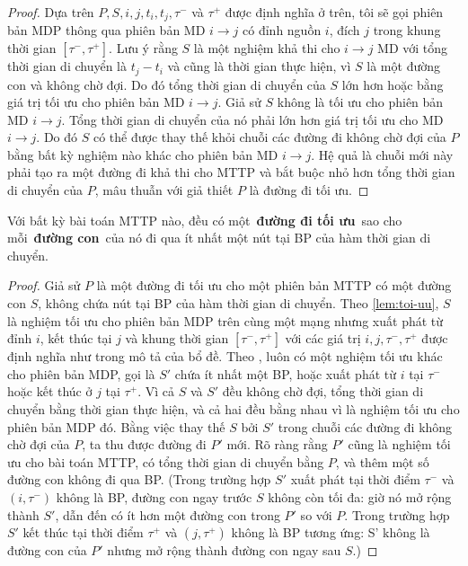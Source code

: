 \documentclass[../main.tex]{subfiles}
\begin{document}
\begin{proof}
Dựa trên $P, S, i, j, t_i, t_j, \tau^-$ và $\tau^+$ được định nghĩa ở trên, tôi sẽ gọi phiên bản MDP thông qua phiên bản MD $i\to j$ có đỉnh nguồn $i$, đích $j$ trong khung thời gian $[\tau^-, \tau^+]$. Lưu ý rằng $S$ là một nghiệm khả thi cho $i \to j$ MD với tổng thời gian di chuyển là $t_j - t_i$ và cũng là thời gian thực hiện, vì $S$ là một đường con và không chờ đợi. Do đó tổng thời gian di chuyển của \(S\) lớn hơn hoặc bằng giá trị tối ưu cho phiên bản MD \(i\to j\). Giả sử \(S\) không là tối ưu cho phiên bản MD \(i \to j\). Tổng thời gian di chuyển của nó phải lớn hơn giá trị tối ưu cho MD \(i \to j\). Do đó \(S\) có thể được thay thế khỏi chuỗi các đường đi không chờ đợi của \(P\) bằng bất kỳ nghiệm nào khác cho phiên bản MD \(i \to j\). Hệ quả là chuỗi mới này phải tạo ra một đường đi khả thi cho MTTP và bắt buộc nhỏ hơn tổng thời gian di chuyển của \(P\), mâu thuẫn với giả thiết \(P\) là đường đi tối ưu.
\end{proof}

\begin{proposition}
\label{prp:mttp-toi-uu}
Với bất kỳ bài toán MTTP nào, đều có
một~\textbf{đường đi tối ưu}~sao cho mỗi~\textbf{đường con}~của nó đi
qua ít nhất một nút tại BP của hàm thời gian di chuyển.
\end{proposition}

\begin{proof}

  Giả sử \(P\) là một đường đi tối ưu cho một phiên bản MTTP có một đường con \(S\), không chứa nút tại BP của hàm thời gian di chuyển. Theo \autoref{lem:toi-uu}, \(S\) là nghiệm tối ưu cho phiên bản MDP trên cùng một mạng nhưng xuất phát từ đỉnh \(i\), kết thúc tại \(j\) và khung thời gian \([\tau^−,\tau^+]\) với các giá trị \(i, j, \tau^-, \tau^+\) được định nghĩa như trong mô tả của bổ đề. Theo \cite{foschini2011complexity}, luôn có một nghiệm tối ưu khác cho phiên bản MDP, gọi là \(S'\) chứa ít nhất một BP, hoặc xuất phát từ \(i\) tại \(\tau^-\) hoặc kết thúc ở \(j\) tại \(\tau^+\). Vì cả \(S\) và \(S'\) đều không chờ đợi, tổng thời gian di chuyển bằng thời gian thực hiện, và cả hai đều bằng nhau vì là nghiệm tối ưu cho phiên bản MDP đó. Bằng việc thay thế \(S\) bởi \(S'\) trong chuỗi các đường đi không chờ đợi của \(P\), ta thu được đường đi \(P'\) mới. Rõ ràng rằng \(P'\) cũng là nghiệm tối ưu cho bài toán MTTP, có tổng thời gian di chuyển bằng \(P\), và thêm một số đường con không đi qua BP. (Trong trường hợp \(S'\) xuất phát tại thời điểm \(\tau^-\) và \((i, \tau^-)\) không là BP, đường con ngay trước \(S\) không còn tối đa: giờ nó mở rộng thành \(S'\), dẫn đến có ít hơn một đường con trong \(P'\) so với \(P\). Trong trường hợp \(S'\) kết thúc tại thời điểm \(\tau^+\) và \((j, \tau^+)\) không là BP tương ứng: S' không là đường con của \(P'\)  nhưng mở rộng thành đường con ngay sau \(S\).)

\end{proof}
\end{document}
